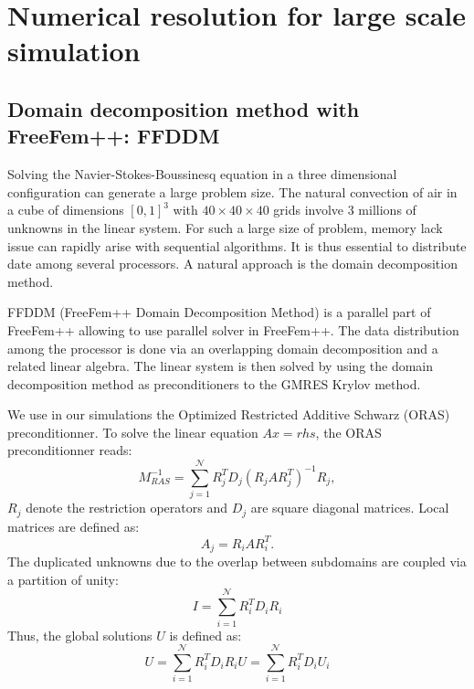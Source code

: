 \section{Numerical resolution for large scale simulation}

\subsection{Domain decomposition method with FreeFem++: FFDDM}
Solving the Navier-Stokes-Boussinesq equation in a three dimensional configuration can generate a large problem size.
The natural convection of air in a cube of dimensions $[0,1]^3$ with $40 \times 40 \times 40$ grids involve $3$ millions of unknowns in the linear system.
For such a large size of problem, memory lack issue can rapidly arise with sequential algorithms.
It is thus essential to distribute date among several processors.
A natural approach is the domain decomposition method.

FFDDM (FreeFem++ Domain Decomposition Method) is a parallel part of FreeFem++ allowing to use parallel solver in FreeFem++.
The data distribution among the processor is done via an overlapping domain decomposition and a related linear algebra.
The linear system is then solved by using the domain decomposition method as preconditioners to the GMRES Krylov method.

We use in our simulations the Optimized Restricted Additive Schwarz (ORAS) preconditionner.
To solve the linear equation $A x = rhs$, the ORAS preconditionner reads:
\begin{equation}
   M_{RAS}^{-1} = \sum_{j=1}^{\mathcal{N}} R^T_j D_j (R_j A R^T_j)^{-1} R_j,
\end{equation}
$R_j$ denote the restriction operators and $D_j$ are square diagonal matrices.
Local matrices are defined as:
\begin{equation}
   A_j = R_i A R_i^T.
\end{equation}
The duplicated unknowns due to the overlap between subdomains are coupled via a partition of unity:
\begin{equation}
   I = \sum_{i=1}^{\mathcal{N}} R_i^T D_i R_i
\end{equation}
Thus, the global solutions $U$ is defined as:
\begin{equation}
  U = \sum_{i=1}^{\mathcal{N}} R_i^T D_i R_i U =  \sum_{i=1}^{\mathcal{N}} R_i^T D_i U_i
\end{equation}

